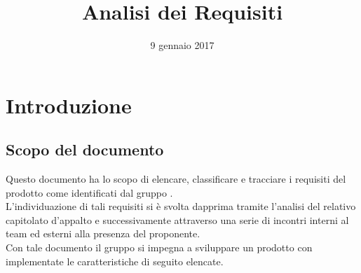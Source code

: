 


\author{\ALL}
\supervisor{\ALL}
\title{Analisi dei Requisiti}
\date{9 gennaio 2017}


\maketitle

\tableofcontents
\listoffigures

\newpage

\newcommand{\myimg}[1]
{

\begin{figure}[H]
\makebox[\textwidth][c]
{
\texttt{[image: Diagrammi casi d'uso/\#1]}
}
\caption{#1}
\label{#1}
\end{figure}

}
\newcommand{\myimgsmall}[1]
{

\begin{figure}[H]
\makebox[\textwidth][c]
{
\texttt{[image: Diagrammi casi d'uso/\#1]}
}
\caption{#1}
\label{#1}

\end{figure}

}

\newcommand{\myimgvsmall}[1]
{

\begin{figure}[H]
\makebox[\textwidth][c]
{
\texttt{[image: Diagrammi casi d'uso/\#1]}
}
\caption{#1}
\label{#1}

\end{figure}

}


\section{Introduzione}
	\subsection{Scopo del documento}
	Questo documento ha lo scopo di elencare, classificare e tracciare i requisiti del prodotto \proj{} come identificati dal gruppo \hx{}. 
	\\L'individuazione di tali requisiti si è svolta dapprima tramite l'analisi del relativo capitolato d'appalto e successivamente attraverso una serie di incontri interni al team ed esterni alla presenza del proponente.
	\\Con tale documento il gruppo \hx{} si impegna a sviluppare un prodotto con implementate le caratteristiche di seguito elencate.

